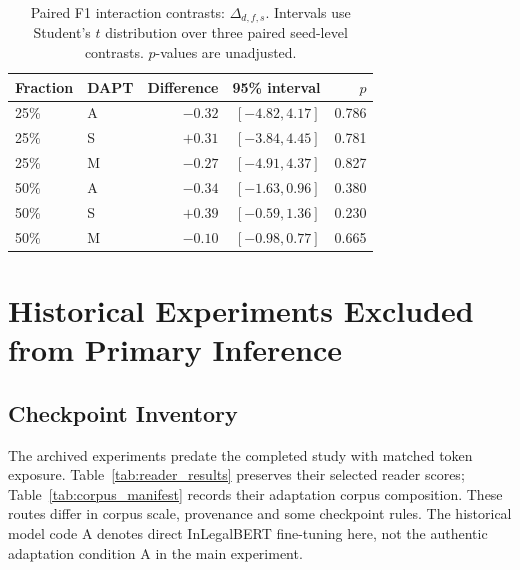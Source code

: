 \documentclass[pdflatex,sn-basic]{sn-jnl}
\begin{document}
\begin{table}[!htbp]
\caption{Paired F1 interaction contrasts:
\(\Delta_{d,f,s}\). Intervals use Student's \(t\) distribution over three
paired seed-level contrasts. \(p\)-values are unadjusted.}
\label{tab:interactions}
\centering\small
\begin{tabular}{@{}llrrr@{}}
\toprule
Fraction & DAPT & Difference & 95\% interval & \(p\) \\
\midrule
25\% & A & $-0.32$ & $[-4.82,4.17]$ & 0.786 \\
25\% & S & $+0.31$ & $[-3.84,4.45]$ & 0.781 \\
25\% & M & $-0.27$ & $[-4.91,4.37]$ & 0.827 \\
50\% & A & $-0.34$ & $[-1.63,0.96]$ & 0.380 \\
50\% & S & $+0.39$ & $[-0.59,1.36]$ & 0.230 \\
50\% & M & $-0.10$ & $[-0.98,0.77]$ & 0.665 \\
\bottomrule
\end{tabular}
\end{table}
\FloatBarrier

\section{Historical Experiments Excluded from Primary Inference}\label{sec:archived}\label{app:audit}

\subsection{Checkpoint Inventory}

The archived experiments predate the completed study with matched token exposure.
Table~\ref{tab:reader_results} preserves their selected reader scores;
Table~\ref{tab:corpus_manifest} records their adaptation corpus composition.
These routes differ in corpus scale, provenance and some checkpoint rules.
The historical model code A denotes direct InLegalBERT fine-tuning here,
not the authentic adaptation condition A in the main experiment.
\end{document}
